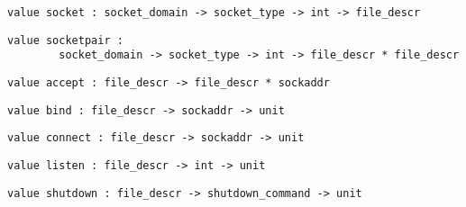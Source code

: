 \begin{verbatim}
value socket : socket_domain -> socket_type -> int -> file_descr
\end{verbatim}
%
\begin{comment}
 Create a new socket in the given domain, and with the
           given kind. The third argument is the protocol type; 0 selects
           the default protocol for that kind of sockets. 
\end{comment}
\begin{verbatim}
value socketpair :
        socket_domain -> socket_type -> int -> file_descr * file_descr
\end{verbatim}
%
\begin{comment}
 Create a pair of unnamed sockets, connected together. 
\end{comment}
\begin{verbatim}
value accept : file_descr -> file_descr * sockaddr
\end{verbatim}
%
\begin{comment}
 Accept connections on the given socket. The returned descriptor
           is a socket connected to the client; the returned address is
           the address of the connecting client. 
\end{comment}
\begin{verbatim}
value bind : file_descr -> sockaddr -> unit
\end{verbatim}
%
\begin{comment}
 Bind a socket to an address. 
\end{comment}
\begin{verbatim}
value connect : file_descr -> sockaddr -> unit
\end{verbatim}
%
\begin{comment}
 Connect a socket to an address. 
\end{comment}
\begin{verbatim}
value listen : file_descr -> int -> unit
\end{verbatim}
%
\begin{comment}
 Set up a socket for receiving connection requests. The integer
           argument is the maximal number of pending requests. 
\end{comment}
\begin{verbatim}
value shutdown : file_descr -> shutdown_command -> unit
\end{verbatim}
